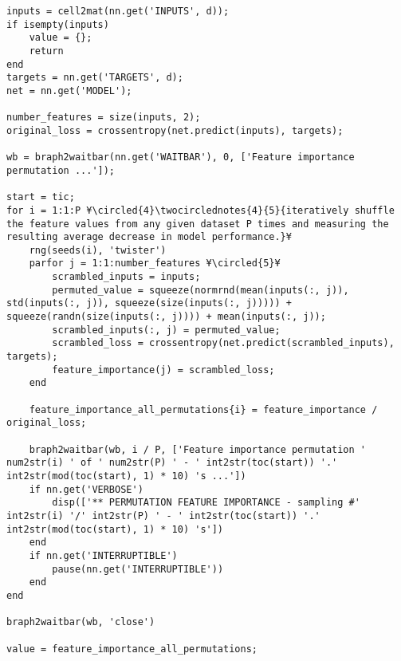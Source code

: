 \documentclass{tufte-handout}
\begin{document}
\begin{lstlisting}
inputs = cell2mat(nn.get('INPUTS', d));
if isempty(inputs)
    value = {};
    return
end
targets = nn.get('TARGETS', d);
net = nn.get('MODEL');

number_features = size(inputs, 2);
original_loss = crossentropy(net.predict(inputs), targets);

wb = braph2waitbar(nn.get('WAITBAR'), 0, ['Feature importance permutation ...']);

start = tic;
for i = 1:1:P ¥\circled{4}\twocirclednotes{4}{5}{iteratively shuffle the feature values from any given dataset P times and measuring the resulting average decrease in model performance.}¥
    rng(seeds(i), 'twister')
    parfor j = 1:1:number_features ¥\circled{5}¥
        scrambled_inputs = inputs;
        permuted_value = squeeze(normrnd(mean(inputs(:, j)), std(inputs(:, j)), squeeze(size(inputs(:, j))))) + squeeze(randn(size(inputs(:, j)))) + mean(inputs(:, j));
        scrambled_inputs(:, j) = permuted_value;
        scrambled_loss = crossentropy(net.predict(scrambled_inputs), targets);
        feature_importance(j) = scrambled_loss;
    end

    feature_importance_all_permutations{i} = feature_importance / original_loss;

    braph2waitbar(wb, i / P, ['Feature importance permutation ' num2str(i) ' of ' num2str(P) ' - ' int2str(toc(start)) '.' int2str(mod(toc(start), 1) * 10) 's ...'])
    if nn.get('VERBOSE')
        disp(['** PERMUTATION FEATURE IMPORTANCE - sampling #' int2str(i) '/' int2str(P) ' - ' int2str(toc(start)) '.' int2str(mod(toc(start), 1) * 10) 's'])
    end
    if nn.get('INTERRUPTIBLE')
        pause(nn.get('INTERRUPTIBLE'))
    end
end

braph2waitbar(wb, 'close')

value = feature_importance_all_permutations;
\end{lstlisting}

\clearpage
\end{document}
